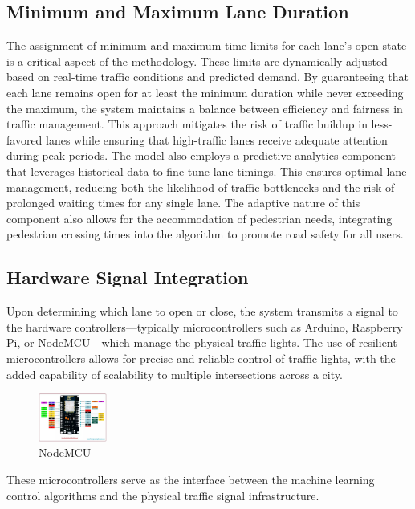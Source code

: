 \documentclass[usenatbib]{tjaa}
\begin{document}
\subsection{Minimum and Maximum Lane Duration}
The assignment of minimum and maximum time limits for each lane's open state is a critical aspect of the methodology. These limits are dynamically adjusted based on real-time traffic conditions and predicted demand. By guaranteeing that each lane remains open for at least the minimum duration while never exceeding the maximum, the system maintains a balance between efficiency and fairness in traffic management. This approach mitigates the risk of traffic buildup in less-favored lanes while ensuring that high-traffic lanes receive adequate attention during peak periods. The model also employs a predictive analytics component that leverages historical data to fine-tune lane timings. This ensures optimal lane management, reducing both the likelihood of traffic bottlenecks and the risk of prolonged waiting times for any single lane. The adaptive nature of this component also allows for the accommodation of pedestrian needs, integrating pedestrian crossing times into the algorithm to promote road safety for all users.

\subsection{Hardware Signal Integration}
Upon determining which lane to open or close, the system transmits a signal to the hardware controllers—typically microcontrollers such as Arduino, Raspberry Pi, or NodeMCU—which manage the physical traffic lights. The use of resilient microcontrollers allows for precise and reliable control of traffic lights, with the added capability of scalability to multiple intersections across a city.
\begin{figure}
    \centering
    \includegraphics[width=0.2\textwidth]{3.jpeg}
    \caption{NodeMCU}
    \label{fig:wrap1}
\end{figure}
These microcontrollers serve as the interface between the machine learning control algorithms and the physical traffic signal infrastructure.
\end{document}
